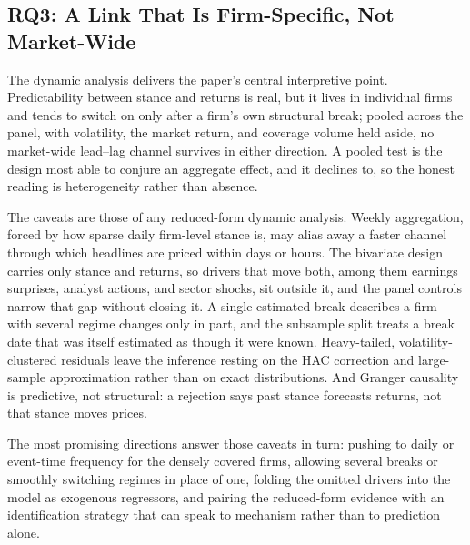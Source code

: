 \documentclass[conference]{IEEEtran}
\begin{document}
\subsection{RQ3: A Link That Is Firm-Specific, Not Market-Wide}
The dynamic analysis delivers the paper's central interpretive point. Predictability
between stance and returns is real, but it lives in individual firms and tends to
switch on only after a firm's own structural break; pooled across the panel, with
volatility, the market return, and coverage volume held aside, no market-wide
lead--lag channel survives in either direction. A pooled test is the design most able
to conjure an aggregate effect, and it declines to, so the honest reading is
heterogeneity rather than absence.

The caveats are those of any reduced-form dynamic analysis. Weekly aggregation, forced
by how sparse daily firm-level stance is, may alias away a faster channel through which
headlines are priced within days or hours. The bivariate design carries only stance and
returns, so drivers that move both, among them earnings surprises, analyst actions, and
sector shocks, sit outside it, and the panel controls narrow that gap without closing
it. A single estimated break describes a firm with several regime changes only in part,
and the subsample split treats a break date that was itself estimated as though it were
known. Heavy-tailed, volatility-clustered residuals leave the inference resting on the
HAC correction and large-sample approximation rather than on exact distributions. And
Granger causality is predictive, not structural: a rejection says past stance forecasts
returns, not that stance moves prices.

The most promising directions answer those caveats in turn: pushing to daily or
event-time frequency for the densely covered firms, allowing several breaks or smoothly
switching regimes in place of one, folding the omitted drivers into the model as
exogenous regressors, and pairing the reduced-form evidence with an identification
strategy that can speak to mechanism rather than to prediction alone.

\end{document}
